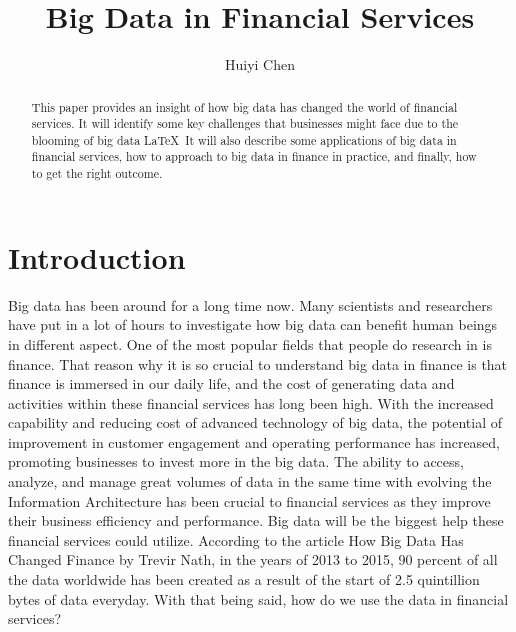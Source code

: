 \documentclass[sigconf]{acmart}
\begin{document}
\title{Big Data in Financial Services}


\author{Huiyi Chen}



\renewcommand{\shortauthors}{H. CHEN}


\begin{abstract}
This paper provides an insight of how big data has changed the world of financial services. It will identify some key challenges that businesses might face due to the blooming of big data \LaTeX\ It will also describe some applications of big data in financial services, how to approach to big data in finance in practice, and finally, how to get the right outcome.
\end{abstract}



\maketitle

\section{Introduction}

Big data has been around for a long time now. Many scientists and researchers have put in a lot of hours to investigate how big data can benefit human beings in different aspect. One of the most popular fields that people do research in is finance. That reason why it is so crucial to understand big data in finance is that finance is immersed in our daily life, and the cost of generating data and activities within these financial services has long been high. With the increased capability and reducing cost of advanced technology of big data, the potential of improvement in customer engagement and operating performance has increased, promoting businesses to invest more in the big data. The ability to access, analyze, and manage great volumes of data in the same time with evolving the Information Architecture has been crucial to financial services as they improve their business efficiency and performance.\cite{Stackowiak2015} Big data will be the biggest help these financial services could utilize. According to the article How Big Data Has Changed Finance by Trevir Nath, in the years of 2013 to 2015, 90 percent of all the data worldwide has been created as a result of the start of 2.5 quintillion bytes of data everyday.\cite{Nath2015} With that being said, how do we use the data in financial services?
\end{document}
